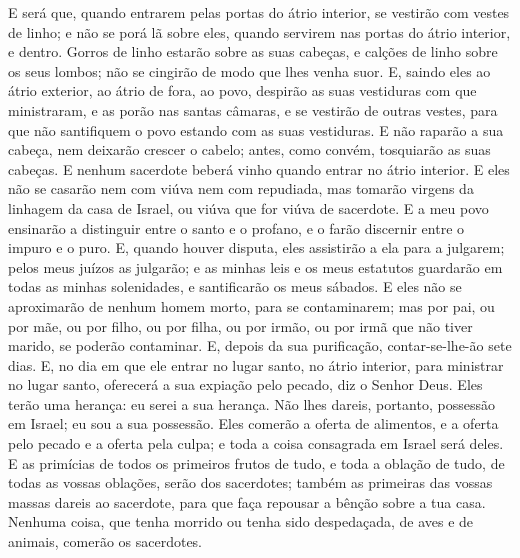 E será que, quando entrarem pelas portas do átrio interior, se
vestirão com vestes de linho; e não se porá lã sobre eles, quando
servirem nas portas do átrio interior, e dentro. Gorros de
linho estarão sobre as suas cabeças, e calções de linho sobre os
seus lombos; não se cingirão de modo que lhes venha suor. E,
saindo eles ao átrio exterior, ao átrio de fora, ao povo, despirão
as suas vestiduras com que ministraram, e as porão nas santas
câmaras, e se vestirão de outras vestes, para que não santifiquem o
povo estando com as suas vestiduras. E não raparão a sua
cabeça, nem deixarão crescer o cabelo; antes, como convém,
tosquiarão as suas cabeças. E nenhum sacerdote beberá vinho
quando entrar no átrio interior. E eles não se casarão nem
com viúva nem com repudiada, mas tomarão virgens da linhagem da casa
de Israel, ou viúva que for viúva de sacerdote. E a meu povo
ensinarão a distinguir entre o santo e o profano, e o farão
discernir entre o impuro e o puro. E, quando houver disputa,
eles assistirão a ela para a julgarem; pelos meus juízos as
julgarão; e as minhas leis e os meus estatutos guardarão em todas as
minhas solenidades, e santificarão os meus sábados. E eles
não se aproximarão de nenhum homem morto, para se contaminarem; mas
por pai, ou por mãe, ou por filho, ou por filha, ou por irmão, ou
por irmã que não tiver marido, se poderão contaminar. E,
depois da sua purificação, contar-se-lhe-ão sete dias. E, no
dia em que ele entrar no lugar santo, no átrio interior, para
ministrar no lugar santo, oferecerá a sua expiação pelo pecado, diz
o Senhor Deus. Eles terão uma herança: eu serei a sua
herança. Não lhes dareis, portanto, possessão em Israel; eu sou a
sua possessão. Eles comerão a oferta de alimentos, e a oferta
pelo pecado e a oferta pela culpa; e toda a coisa consagrada em
Israel será deles. E as primícias de todos os primeiros
frutos de tudo, e toda a oblação de tudo, de todas as vossas
oblações, serão dos sacerdotes; também as primeiras das vossas
massas dareis ao sacerdote, para que faça repousar a bênção sobre a
tua casa. Nenhuma coisa, que tenha morrido ou tenha sido
despedaçada, de aves e de animais, comerão os sacerdotes.

\medskip

